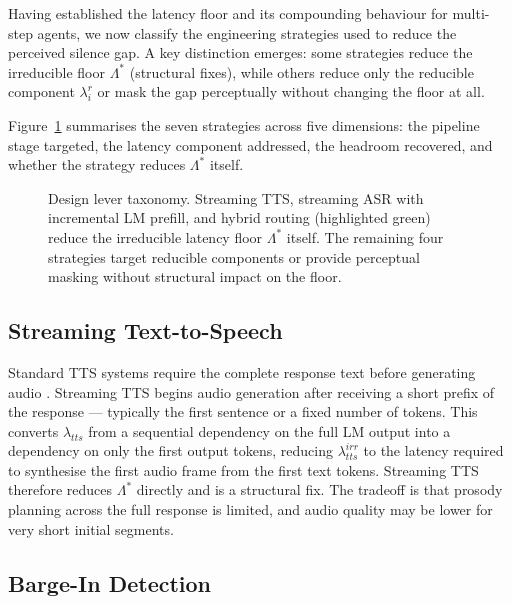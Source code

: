 Having established the latency floor and its compounding behaviour for multi-step agents,
we now classify the engineering strategies used to reduce the perceived silence gap.
A key distinction emerges: some strategies reduce the irreducible floor $\Lambda^*$
(structural fixes), while others reduce only the reducible component $\lambda_i^r$
or mask the gap perceptually without changing the floor at all.

Figure~\ref{fig:design_levers} summarises the seven strategies across five dimensions:
the pipeline stage targeted, the latency component addressed, the headroom recovered,
and whether the strategy reduces $\Lambda^*$ itself.

\begin{figure}[t]
  \centering
  \resizebox{\linewidth}{!}{%
  }
  \caption{Design lever taxonomy.
           Streaming TTS, streaming ASR with incremental LM prefill, and hybrid routing
           (highlighted green) reduce the irreducible latency floor $\Lambda^*$ itself.
           The remaining four strategies target reducible components or provide
           perceptual masking without structural impact on the floor.}
  \label{fig:design_levers}
\end{figure}

\subsection{Streaming Text-to-Speech}

Standard TTS systems require the complete response text before generating audio
\citep{shen2018natural}.
Streaming TTS begins audio generation after receiving a short prefix of the response ---
typically the first sentence or a fixed number of tokens.
This converts $\lambda_{tts}$ from a sequential dependency on the full LM output into
a dependency on only the first output tokens,
reducing $\lambda_{tts}^{irr}$ to the latency required to synthesise the first audio frame
from the first text tokens.
Streaming TTS therefore reduces $\Lambda^*$ directly and is a structural fix.
The tradeoff is that prosody planning across the full response is limited,
and audio quality may be lower for very short initial segments.

\subsection{Barge-In Detection}

